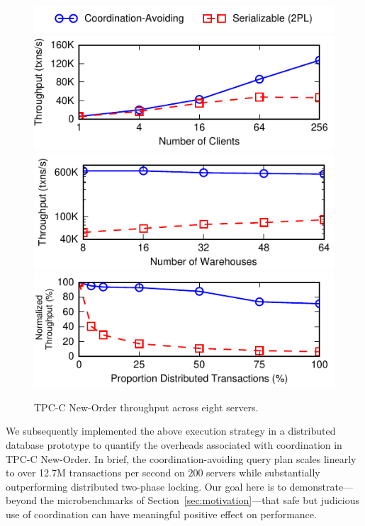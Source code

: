\begin{figure}
\hspace{1.5em}\includegraphics{figs/ca_serial_legend.pdf}\vspace{-1em}
\includegraphics[width=\columnwidth]{figs/client_thru.pdf}
\includegraphics[width=\columnwidth]{figs/wh_thru.pdf}
\includegraphics[width=\columnwidth]{figs/remote_thru.pdf}\vspace{-.5em}
\caption{TPC-C New-Order throughput across eight servers.}
\label{fig:clients}
\end{figure}


We subsequently implemented the above execution strategy in a distributed
database prototype to quantify the overheads associated with
coordination in TPC-C New-Order. In brief, the coordination-avoiding
query plan scales linearly to over 12.7M transactions per second on
$200$ servers while substantially outperforming distributed two-phase
locking. Our goal here is to demonstrate---beyond the microbenchmarks of
Section~\ref{sec:motivation}---that safe but judicious use of
coordination can have meaningful positive effect on performance.

